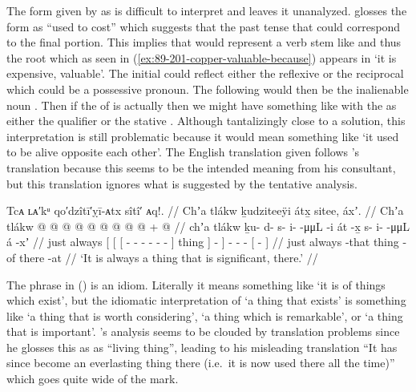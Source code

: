 The form given by \citeauthor{swanton:1909} as  is difficult to interpret and \textcite[10]{leer:1977} leaves it unanalyzed.
\citeauthor{swanton:1909} glosses the form as “used to cost” which suggests that the past tense  that could correspond to the final  portion.
This implies that  would represent a verb stem like  and thus the root  which as seen in (\ref{ex:89-201-copper-valuable-because}) appears in  ‘it is expensive, valuable’.
The initial  could reflect either the reflexive  or the reciprocal  which could be a possessive pronoun.
The following  would then be the inalienable noun .
Then if the  of  is actually  then we might have something like  with the  as either the qualifier  or the stative .
Although tantalizingly close to a solution, this interpretation is still problematic because it would mean something like ‘it used to be alive opposite each other’.
The English translation given follows \citeauthor{swanton:1909}’s translation because this seems to be the intended meaning from his consultant, but this translation ignores what is suggested by the tentative analysis.

\ex\label{ex:89-203-always-thing-that-exists}%
%
\begingl
	\glpreamble	Tcᴀ ʟᴀ′kᵘ qo′dzîtī′ỵī-ᴀtx sîtî′ ᴀq!. //
	\glpreamble	Chʼa tlákw ḵudziteeÿi átx̱ sitee, áxʼ. //
	\gla	Chʼa tlákw
		{} {} {}  @ {} @ {} @ {} @ {} @ {} @ {} {}  {} {} {}
		 @ {} @ {} @ {} +
		{}  @ {} {} //
	\glb	chʼa tlákw
		{} {} {} ḵu- d- s- i-  -μμL -i {} át {} -x̱ {}
		s- i-  -μμL
		{} á -xʼ {} //
	\glc	just always
		{}[ {}[ {}[ - - - -  - - {}]
			thing {}] - {}]
		- -  -
		{}[  - {}] //
	\gld	just always
		{} {} {}  {} {} {} {} {} -that {} thing {} -of {}
		 {} {} {}
		{} there -at {} //
	\glft	‘It is always a thing that is significant, there.’
		//
\endgl
\xe

The phrase  in (\lastx) is an idiom.
Literally it means something like ‘it is of things which exist’, but the idiomatic interpretation of ‘a thing that exists’ is something like ‘a thing that is worth considering’, ‘a thing which is remarkable’, or ‘a thing that is important’.
\citeauthor{swanton:1909}’s analysis seems to be clouded by translation problems since he glosses this as  as “living thing”, leading to his misleading translation “It has since become an everlasting thing there (i.e.\ it is now used there all the time)” which goes quite wide of the mark.
